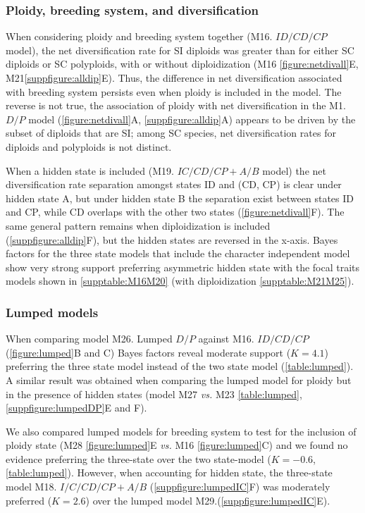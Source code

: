 \subsubsection{Ploidy, breeding system, and diversification}
When considering ploidy and breeding system together (M16. $ID/CD/CP$ model), the net diversification rate for SI diploids was greater than for either SC diploids or SC polyploids, with or without diploidization (M16 \cref{figure:netdivall}E, M21\cref{suppfigure:alldip}E).
Thus, the difference in net diversification associated with breeding system persists even when ploidy is included in the model.
The reverse is not true, the association of ploidy with net diversification in the M1. $D/P$ model (\cref{figure:netdivall}A, \cref{suppfigure:alldip}A) appears to be driven by the subset of diploids that are SI; among SC species, net diversification rates for diploids and polyploids is not distinct.

When a hidden state is included (M19. $IC/CD/CP+A/B$ model) the net diversification rate separation amongst states ID and (CD, CP)  is clear under hidden state A, but under hidden state B the separation exist between states ID and CP, while CD overlaps with the other two states (\cref{figure:netdivall}F).
The same general pattern remains when diploidization is included (\cref{suppfigure:alldip}F), but the hidden states are reversed in the x-axis.
Bayes factors for the three state models that include the character independent model show very strong support preferring asymmetric hidden state with the focal traits models shown in  \cref{supptable:M16M20} (with diploidization \cref{supptable:M21M25}).

\subsubsection{Lumped models}
When comparing model M26. Lumped $D/P$ against M16. $ID/CD/CP$ (\cref{figure:lumped}B and C) Bayes factors reveal moderate support ($K=4.1$) preferring the three state model instead of the two state model (\cref{table:lumped}).
A similar result was obtained when comparing the lumped model for ploidy but in the presence of hidden states (model M27 \textit{vs.} M23 \cref{table:lumped}, \cref{suppfigure:lumpedDP}E and F).

We also compared lumped models for breeding system to test for the inclusion of ploidy state (M28 \cref{figure:lumped}E \textit{vs.} M16 \cref{figure:lumped}C) and we found no evidence preferring the three-state over the two state-model ($K=-0.6$, \cref{table:lumped}).
However, when accounting for hidden state,  the three-state model M18. $I/C/CD/CP+A/B$ (\cref{suppfigure:lumpedIC}F) was moderately preferred ($K=2.6$) over the lumped model M29.(\cref{suppfigure:lumpedIC}E).

